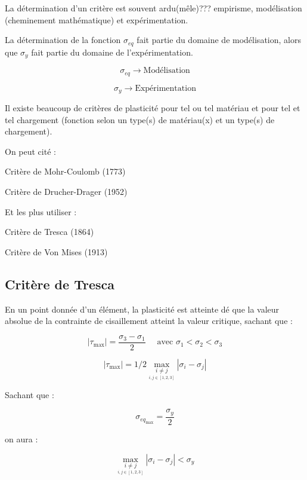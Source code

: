 \documentclass[12pt,a4paper]{report}
\begin{document}
	La détermination d'un critère est souvent ardu(mêle)??? empirisme, modélisation (cheminement mathématique) et expérimentation.
	
	La détermination de la fonction $\sigma_{eq}$ fait partie du domaine de modélisation, alors que $\sigma_{y}$ fait partie du domaine de l'expérimentation.
	
	\[ \sigma_{eq} \rightarrow \text{Modélisation} \]
	
	\[ \sigma_{y} \rightarrow \text{Expérimentation} \]
	
	\vspace{\baselineskip}
	
	Il existe beaucoup de critères de plasticité pour tel ou tel matériau et pour tel et tel chargement (fonction selon un type(s) de matériau(x) et un type(s) de chargement).
	
	On peut cité : 
	
	{\centering Critère de Mohr-Coulomb (1773) 
	
	Critère de Drucher-Drager (1952)
	
	Et les plus utiliser :
	
	Critère de Tresca (1864)
	
	Critère de Von Mises (1913) \par}
	
	
	\subsection{Critère de Tresca}
	
	En un point donnée d'un élément, la plasticité est atteinte dé que la valeur absolue de la contrainte de cisaillement atteint la valeur critique, sachant que :
	
	\[ |\tau_{\max}| = \dfrac{\sigma_{3} - \sigma_{1}}{2} \quad\text{ avec } \sigma_{1} < \sigma_{2} < \sigma_{3}  \]
	
	
	\vspace{\baselineskip}
	
	\[ |\tau_{\max}| = 1/2 \underset{\underset{i,j \in [1,2,3]}{i\neq j}}{\max} |\sigma_{i} - \sigma_{j}| \]
	
	{\centering Sachant que : \par}
	
	\[ \sigma_{eq_{\max}} = \dfrac{\sigma_{y}}{2} \]
	
	{\centering on aura : \par}
	
	\[ \underset{\underset{i,j \in [1,2,3]}{i\neq j}}{\max} |\sigma_{i} - \sigma_{j}| < \sigma_{y} \]
	
\end{document}
